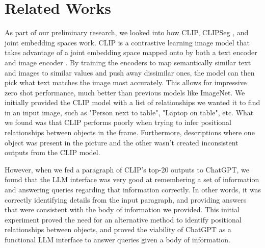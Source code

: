 \documentclass[letterpaper, 10 pt, conference]{ieeeconf}  %
\begin{document}
\section{Related Works}
    As part of our preliminary research, we looked into how CLIP, CLIPSeg \cite{lueddecke22_cvpr}, and joint embedding spaces work. CLIP is a contrastive learning image model that takes advantage of a joint embedding space mapped onto by both a text encoder and image encoder \cite{radford2021learning}. By training the encoders to map semantically similar text and images to similar values and push away dissimilar ones, the model can then pick what text matches the image most accurately. This allows for impressive zero shot performance, much better than previous models like ImageNet. We initially provided the CLIP model with a list of relationships we wanted it to find in an input image, such as "Person next to table", "Laptop on table", etc. What we found was that CLIP performs poorly when trying to infer positional relationships between objects in the frame. Furthermore, descriptions where one object was present in the picture and the other wasn't created inconsistent outputs from the CLIP model.

    However, when we fed a paragraph of CLIP's top-20 outputs to ChatGPT, we found that the LLM interface was very good at remembering a set of information and answering queries regarding that information correctly. In other words, it was correctly identifying details from the input paragraph, and providing answers that were consistent with the body of information we provided. This initial experiment proved the need for an alternative method to identify positional relationships between objects, and proved the viability of ChatGPT as a functional LLM interface to answer queries given a body of information.
\end{document}
